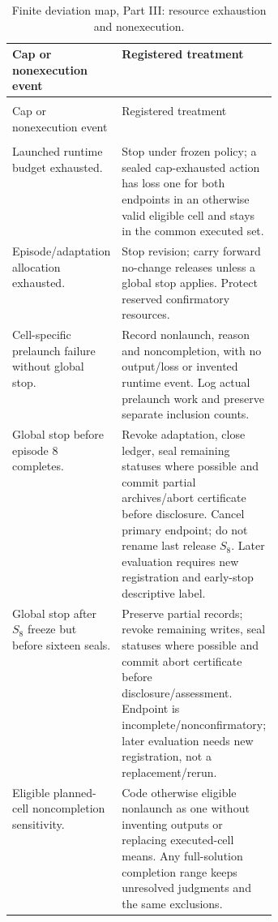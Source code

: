 \documentclass[10pt]{article} %
\providecommand{\1}{\mathbf{1}}  %
\theoremstyle{remark}
\theoremstyle{definition}
\begin{document}
\begingroup
\footnotesize
\renewcommand{\arraystretch}{1.13}
\setlength{\LTpre}{6pt}
\setlength{\LTpost}{8pt}
\setlength{\LTcapwidth}{\linewidth}
\begin{longtable}{@{}>{\raggedright\arraybackslash}p{0.38\linewidth}>{\raggedright\arraybackslash}p{}@{}}
\caption{Finite deviation map, Part III: resource exhaustion and nonexecution.}\label{tab:prospective-deviation-map-c}\\
\toprule
Cap or nonexecution event & Registered treatment \\
\midrule
\endfirsthead
\multicolumn{2}{@{}l}{\textit{Table \thetable\ continued}}\\
\toprule
Cap or nonexecution event & Registered treatment \\
\midrule
\endhead
\midrule
\multicolumn{2}{r@{}}{\textit{Continued on next page}}\\
\endfoot
\bottomrule
\endlastfoot

Launched runtime budget exhausted. & Stop under frozen policy; a sealed cap-exhausted action has loss one for both endpoints in an otherwise valid eligible cell and stays in the common executed set. \\
Episode/adaptation allocation exhausted. & Stop revision; carry forward no-change releases unless a global stop applies. Protect reserved confirmatory resources. \\
Cell-specific prelaunch failure without global stop. & Record nonlaunch, reason and noncompletion, with no output/loss or invented runtime event. Log actual prelaunch work and preserve separate inclusion counts. \\
Global stop before episode 8 completes. & Revoke adaptation, close ledger, seal remaining statuses where possible and commit partial archives/abort certificate before disclosure. Cancel primary endpoint; do not rename last release $S_8$. Later evaluation requires new registration and early-stop descriptive label. \\
Global stop after $S_8$ freeze but before sixteen seals. & Preserve partial records; revoke remaining writes, seal statuses where possible and commit abort certificate before disclosure/assessment. Endpoint is incomplete/nonconfirmatory; later evaluation needs new registration, not a replacement/rerun. \\
Eligible planned-cell noncompletion sensitivity. & Code otherwise eligible nonlaunch as one without inventing outputs or replacing executed-cell means. Any full-solution completion range keeps unresolved judgments and the same exclusions. \\
\end{longtable}
\endgroup
\end{document}
